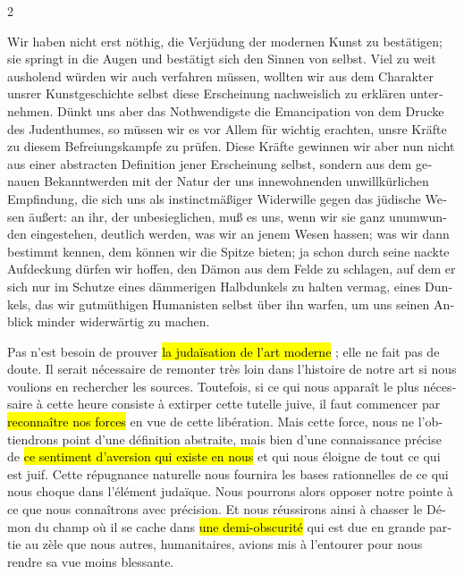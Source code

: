 \documentclass[a4paper,12pt]{article}
\newcommand\chunks[2]{%
\begin{leftcolumn*}\begin{otherlanguage}{german}%
{#1}%
\end{otherlanguage}\end{leftcolumn*}%
\begin{rightcolumn}\begin{otherlanguage}{french}%
{#2}%
\end{otherlanguage}\end{rightcolumn}%
}
\newcommand{\ornamentbreak}{%
  \begin{center}
    \psvectorian[width=2em]{2}\quad\psvectorian[width=2em,mirror]{2}%
  \end{center}%
}
\begin{document}
\begin{paracol}{2}
  \chunks{Wir haben nicht erst nöthig, die Verjüdung der modernen Kunst zu bestätigen; sie springt in die Augen und bestätigt sich den Sinnen von selbst. Viel zu weit ausholend würden wir auch verfahren müssen, wollten wir aus dem Charakter unsrer Kunstgeschichte selbst diese Erscheinung nachweislich zu erklären unternehmen. Dünkt uns aber das Nothwendigste die Emancipation von dem Drucke des Judenthumes, so müssen wir es vor Allem für wichtig erachten, unsre Kräfte zu diesem Befreiungskampfe zu prüfen. Diese Kräfte gewinnen wir aber nun nicht aus einer abstracten Definition jener Erscheinung selbst, sondern aus dem genauen Bekanntwerden mit der Natur der uns innewohnenden unwillkürlichen Empfindung, die sich uns als instinctmäßiger Widerwille gegen das jüdische Wesen äußert: an ihr, der unbesieglichen, muß es uns, wenn wir sie ganz unumwunden eingestehen, deutlich werden, was wir an jenem Wesen hassen; was wir dann bestimmt kennen, dem können wir die Spitze bieten; ja schon durch seine nackte Aufdeckung dürfen wir hoffen, den Dämon aus dem Felde zu schlagen, auf dem er sich nur im Schutze eines dämmerigen Halbdunkels zu halten vermag, eines Dunkels, das wir gutmüthigen Humanisten selbst über ihn warfen, um uns seinen Anblick minder widerwärtig zu machen.\ornamentbreak}
         {Pas n’est besoin de prouver \hl{la judaïsation de l’art moderne} ; elle ne fait pas de doute. Il serait nécessaire de remonter très loin dans l’histoire de notre art si nous voulions en rechercher les sources. Toutefois, si ce qui nous apparaît le plus nécessaire à cette heure consiste à extirper cette tutelle juive, il faut commencer par \hl{reconnaître nos forces} en vue de cette libération. Mais cette force, nous ne l’obtiendrons point d’une définition abstraite, mais bien d’une connaissance précise de \hl{ce sentiment d’aversion qui existe en nous} et qui nous éloigne de tout ce qui est juif. Cette répugnance naturelle nous fournira les bases rationnelles de ce qui nous choque dans l’élément judaïque. Nous pourrons alors opposer notre pointe à ce que nous connaîtrons avec précision. Et nous réussirons ainsi à chasser le Démon du champ où il se cache dans \hl{une demi-obscurité} qui est due en grande partie au zèle que nous autres, humanitaires, avions mis à l’entourer pour nous rendre sa vue moins blessante.}

\end{paracol}
\end{document}
